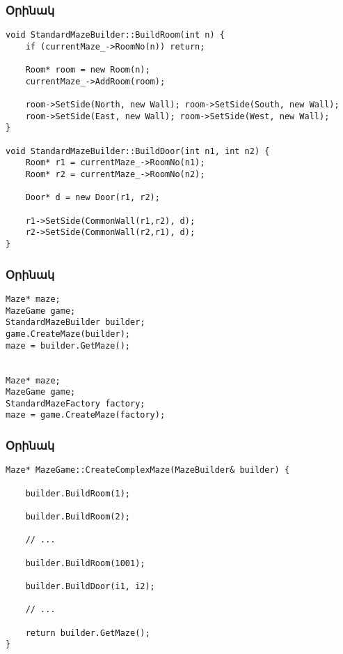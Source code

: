 \documentclass{beamer}
\begin{document}
\begin{frame}[fragile]\frametitle{Օրինակ}
\begin{english}
\begin{verbatim}
void StandardMazeBuilder::BuildRoom(int n) {
    if (currentMaze_->RoomNo(n)) return;

    Room* room = new Room(n);
    currentMaze_->AddRoom(room);

    room->SetSide(North, new Wall); room->SetSide(South, new Wall);
    room->SetSide(East, new Wall); room->SetSide(West, new Wall);
}

void StandardMazeBuilder::BuildDoor(int n1, int n2) {
    Room* r1 = currentMaze_->RoomNo(n1);
    Room* r2 = currentMaze_->RoomNo(n2);

    Door* d = new Door(r1, r2);

    r1->SetSide(CommonWall(r1,r2), d);
    r2->SetSide(CommonWall(r2,r1), d);
}
\end{verbatim}
\end{english}
\end{frame}

\begin{frame}[fragile]\frametitle{Օրինակ}
\begin{english}
\begin{verbatim}
Maze* maze;
MazeGame game;
StandardMazeBuilder builder;
game.CreateMaze(builder);
maze = builder.GetMaze();


Maze* maze;
MazeGame game;
StandardMazeFactory factory;
maze = game.CreateMaze(factory);
\end{verbatim}
\end{english}
\end{frame}

\begin{frame}[fragile]\frametitle{Օրինակ}
\begin{english}
\begin{verbatim}
Maze* MazeGame::CreateComplexMaze(MazeBuilder& builder) {

    builder.BuildRoom(1);

    builder.BuildRoom(2);

    // ...

    builder.BuildRoom(1001);

    builder.BuildDoor(i1, i2);

    // ...

    return builder.GetMaze();
}
\end{verbatim}
\end{english}
\end{frame}
\end{document}
